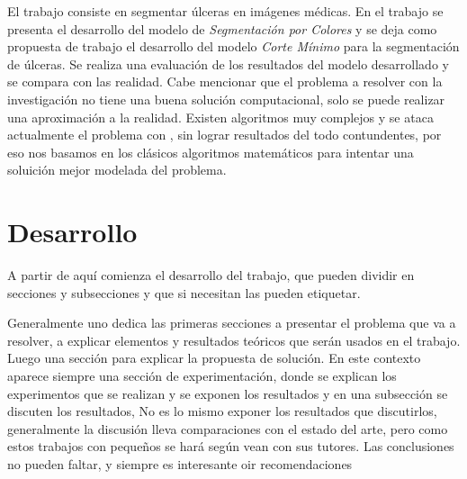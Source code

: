 \documentclass[a4paper,10pt,twocolumn]{article}
\begin{document}
El trabajo consiste en segmentar \'ulceras en im\'agenes m\'edicas. En el trabajo se presenta el desarrollo
del modelo de \textit{Segmentaci\'on por Colores} y se deja como propuesta de trabajo el desarrollo del modelo
\textit{Corte M\'inimo} para la segmentaci\'on de \'ulceras. Se realiza una evaluaci\'on de los resultados del modelo desarrollado
y se compara con las realidad. Cabe mencionar que el problema a resolver con la investigaci\'on no tiene una buena soluci\'on
computacional, solo se puede realizar una aproximaci\'on a la realidad. Existen algoritmos muy complejos y se ataca actualmente el problema con , sin lograr resultados del todo contundentes, por eso nos basamos en los cl\'asicos algoritmos matem\'aticos para intentar una soluici\'on mejor modelada del problema. 




\section{Desarrollo}\label{sec:dev}
A partir de aqu\'{i} comienza el desarrollo del trabajo, que pueden dividir en secciones y subsecciones y que si necesitan las pueden etiquetar.

Generalmente uno dedica las primeras secciones a presentar el problema que va a resolver, a explicar elementos y resultados te\'{o}ricos que ser\'{a}n usados en el trabajo. Luego una secci\'{o}n para explicar la propuesta de soluci\'{o}n.
En este contexto aparece siempre una secci\'{o}n de experimentaci\'{o}n, donde se explican los experimentos que se realizan y se exponen los resultados y en una subsecci\'{o}n se discuten los resultados, No es lo mismo exponer los resultados que discutirlos, generalmente la discusi\'{o}n lleva comparaciones con el estado del arte, pero como estos trabajos con peque\~{n}os se har\'{a} seg\'{u}n  vean con sus tutores.
Las conclusiones no pueden faltar, y siempre es interesante oir recomendaciones
 
 

	\subsection{}\label{}
\end{document}
